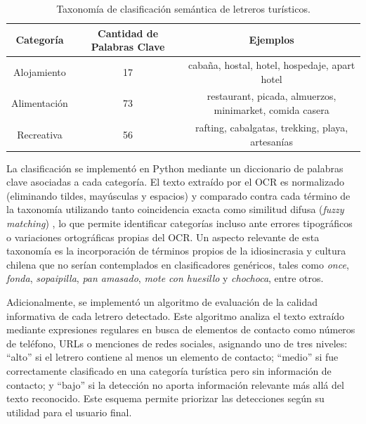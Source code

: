 \documentclass[runningheads]{llncs}
\begin{document}
\begin{table}[H]
\centering
\caption{Taxonomía de clasificación semántica de letreros turísticos.}
\begin{tabular}{|c|c|c|}
\hline
\rowcolor{gray!20}
\textbf{Categoría} & \textbf{Cantidad de Palabras Clave} & \textbf{Ejemplos} \\
\hline
Alojamiento   & 17 & cabaña, hostal, hotel, hospedaje, apart hotel \\
\hline
Alimentación  & 73 & restaurant, picada, almuerzos, minimarket, comida casera \\
\hline
Recreativa    & 56 & rafting, cabalgatas, trekking, playa, artesanías \\
\hline
\end{tabular}
\label{tab:taxonomia}
\end{table}

La clasificación se implementó en Python mediante un diccionario de 
palabras clave asociadas a cada categoría. El texto extraído por el OCR 
es normalizado (eliminando tildes, mayúsculas y espacios) y comparado 
contra cada término de la taxonomía utilizando tanto coincidencia exacta 
como similitud difusa (\textit{fuzzy matching}) \cite{fuzzy-matching}, lo que permite 
identificar categorías incluso ante errores tipográficos o variaciones 
ortográficas propias del OCR. Un aspecto relevante de esta taxonomía es 
la incorporación de términos propios de la idiosincrasia y cultura 
chilena que no serían contemplados en clasificadores genéricos, tales 
como \textit{once}, \textit{fonda}, \textit{sopaipilla}, \textit{pan 
amasado}, \textit{mote con huesillo} y \textit{chochoca}, entre otros.

Adicionalmente, se implementó un algoritmo de evaluación de la calidad 
informativa de cada letrero detectado. Este algoritmo analiza el texto 
extraído mediante expresiones regulares en busca de elementos de 
contacto como números de teléfono, URLs o menciones de redes sociales, 
asignando uno de tres niveles: ``alto'' si el letrero contiene al menos 
un elemento de contacto; ``medio'' si fue correctamente clasificado en 
una categoría turística pero sin información de contacto; y ``bajo'' si 
la detección no aporta información relevante más allá del texto 
reconocido. Este esquema permite priorizar las detecciones según su 
utilidad para el usuario final.
\end{document}
